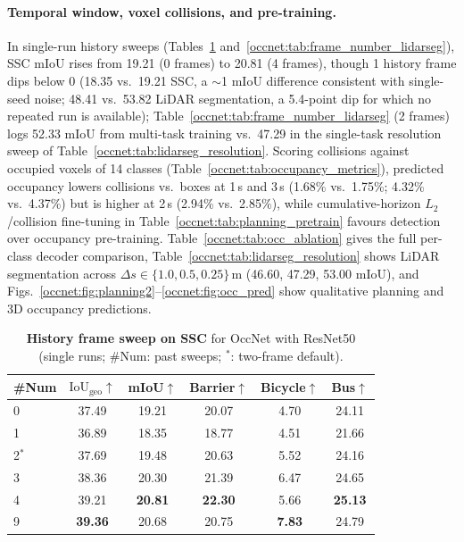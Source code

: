 \paragraph{Temporal window, voxel collisions, and pre-training.} In single-run history sweeps (Tables~\ref{occnet:tab:frame_number_ssc} and~\ref{occnet:tab:frame_number_lidarseg}), SSC mIoU rises from 19.21 (0 frames) to 20.81 (4 frames), though 1 history frame dips below 0 (18.35 vs.\ 19.21 SSC, a $\sim$1 mIoU difference consistent with single-seed noise; 48.41 vs.\ 53.82 LiDAR segmentation, a 5.4-point dip for which no repeated run is available); Table~\ref{occnet:tab:frame_number_lidarseg} (2 frames) logs 52.33 mIoU from multi-task training vs.\ 47.29 in the single-task resolution sweep of Table~\ref{occnet:tab:lidarseg_resolution}. Scoring collisions against occupied voxels of 14 classes (Table~\ref{occnet:tab:occupancy_metrics}), predicted occupancy lowers collisions vs.\ boxes at 1\,s and 3\,s (1.68\% vs.\ 1.75\%; 4.32\% vs.\ 4.37\%) but is higher at 2\,s (2.94\% vs.\ 2.85\%), while cumulative-horizon $L_2$/collision fine-tuning in Table~\ref{occnet:tab:planning_pretrain} favours detection over occupancy pre-training. Table~\ref{occnet:tab:occ_ablation} gives the full per-class decoder comparison, Table~\ref{occnet:tab:lidarseg_resolution} shows LiDAR segmentation across $\Delta s\in\{1.0,0.5,0.25\}$\,m (46.60, 47.29, 53.00 mIoU), and Figs.~\ref{occnet:fig:planning2}--\ref{occnet:fig:occ_pred} show qualitative planning and 3D occupancy predictions.

\begin{table}[t]
  \centering
  \caption[History frame sweep on SSC]{\textbf{History frame sweep on SSC} for OccNet with ResNet50 (single runs; \#Num: past sweeps; $^{\ast}$: two-frame default).}
  \label{occnet:tab:frame_number_ssc}
  \footnotesize
  \begin{tabular}{lccccc}
    \toprule
    \#Num & $\text{IoU}_{\text{geo}}$$\uparrow$ & mIoU$\uparrow$ & Barrier$\uparrow$ & Bicycle$\uparrow$ & Bus$\uparrow$ \\
    \midrule
    0          & 37.49 & 19.21 & 20.07 & 4.70 & 24.11 \\
    1          & 36.89 & 18.35 & 18.77 & 4.51 & 21.66 \\
    2$^{\ast}$ & 37.69 & 19.48 & 20.63 & 5.52 & 24.16 \\
    3          & 38.36 & 20.30 & 21.39 & 6.47 & 24.65 \\
    4          & 39.21 & \textbf{20.81} & \textbf{22.30} & 5.66 & \textbf{25.13} \\
    9          & \textbf{39.36} & 20.68 & 20.75 & \textbf{7.83} & 24.79 \\
    \bottomrule
  \end{tabular}
\end{table}

